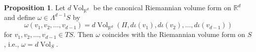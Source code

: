 \documentclass{article}
\theoremstyle{definition}
\renewcommand\det{\operatorname{det}}
\newcommand{\R}{\mathbb{R}}
\theoremstyle{theorem}
\newtheorem{proposition}[theorem]{Proposition}
\newcommand{\Vol}{\operatorname{Vol}}
\begin{document}
\begin{proposition}
Let $d\Vol_{\mathbb{R}^d}$ be the canonical Riemannian volume form on $\mathbb{R}^d$ and define $\omega\in\Lambda^{d-1}S$ by
\begin{equation*}
\omega(v_1,v_2,\dots,v_{d-1})=d\Vol_{\mathbb{R}^d}(\Pi,d\iota(v_1),d\iota(v_2),\dots,d\iota(v_{d-1}))
\end{equation*}
for $v_1,v_2,\dots,v_{d-1}\in TS$. Then $\omega$ coincides with the Riemannian volume form on $S$, i.e., $\omega=d\Vol_S$.
\end{proposition}

\end{document}
